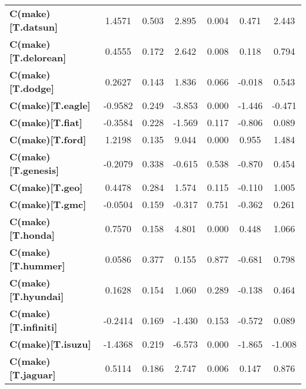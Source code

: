 \begin{center}
\begin{tabular}{lcccccc}
\textbf{C(make)[T.datsun]}        &       1.4571  &        0.503     &     2.895  &         0.004        &        0.471    &        2.443     \\
\textbf{C(make)[T.delorean]}      &       0.4555  &        0.172     &     2.642  &         0.008        &        0.118    &        0.794     \\
\textbf{C(make)[T.dodge]}         &       0.2627  &        0.143     &     1.836  &         0.066        &       -0.018    &        0.543     \\
\textbf{C(make)[T.eagle]}         &      -0.9582  &        0.249     &    -3.853  &         0.000        &       -1.446    &       -0.471     \\
\textbf{C(make)[T.fiat]}          &      -0.3584  &        0.228     &    -1.569  &         0.117        &       -0.806    &        0.089     \\
\textbf{C(make)[T.ford]}          &       1.2198  &        0.135     &     9.044  &         0.000        &        0.955    &        1.484     \\
\textbf{C(make)[T.genesis]}       &      -0.2079  &        0.338     &    -0.615  &         0.538        &       -0.870    &        0.454     \\
\textbf{C(make)[T.geo]}           &       0.4478  &        0.284     &     1.574  &         0.115        &       -0.110    &        1.005     \\
\textbf{C(make)[T.gmc]}           &      -0.0504  &        0.159     &    -0.317  &         0.751        &       -0.362    &        0.261     \\
\textbf{C(make)[T.honda]}         &       0.7570  &        0.158     &     4.801  &         0.000        &        0.448    &        1.066     \\
\textbf{C(make)[T.hummer]}        &       0.0586  &        0.377     &     0.155  &         0.877        &       -0.681    &        0.798     \\
\textbf{C(make)[T.hyundai]}       &       0.1628  &        0.154     &     1.060  &         0.289        &       -0.138    &        0.464     \\
\textbf{C(make)[T.infiniti]}      &      -0.2414  &        0.169     &    -1.430  &         0.153        &       -0.572    &        0.089     \\
\textbf{C(make)[T.isuzu]}         &      -1.4368  &        0.219     &    -6.573  &         0.000        &       -1.865    &       -1.008     \\
\textbf{C(make)[T.jaguar]}        &       0.5114  &        0.186     &     2.747  &         0.006        &        0.147    &        0.876     \\

\end{tabular}
\end{center}
